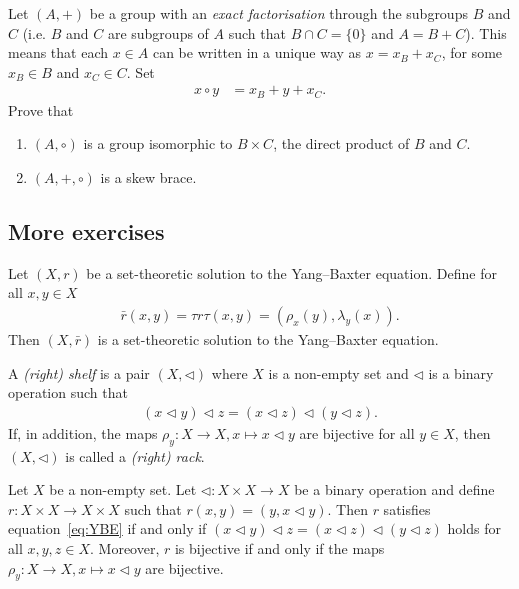 \documentclass[12pt]{amsproc}
\begin{document}
\begin{xca}\label{ex:ef}
        Let $(A,+)$ be a group with an \emph{exact factorisation} through the subgroups $B$ and $C$ (i.e. $B$ and $C$ are subgroups of $A$ such that $B\cap C=\{ 0\}$ and $A=B+C$). 
        This means that each $x\in A$ can be written in a unique way as $x=x_B+x_C$, for some $x_B\in B$ and $x_C\in C$.
        Set
        \begin{align*}
		    x\circ y&=x_B+y+x_C.
	    \end{align*}
        Prove that
        \begin{enumerate}
            \item $(A,\circ)$ is a group isomorphic to $B\times C$, the direct product of $B$ and $C$.
            \item $(A,+,\circ)$ is a  skew brace.
        \end{enumerate}
    \end{xca}

\subsection{More exercises}\mbox{}

\begin{xca}\label{ex:taurtau}
    Let $(X,r)$ be a set-theoretic solution to the Yang--Baxter equation. Define for all $x,y \in X$
    \begin{align*}
        \bar{r}(x,y) = \tau r \tau (x,y) = (\rho_x(y),\lambda_y(x)).
    \end{align*}
    Then $(X,\bar{r})$ is a set-theoretic solution to the Yang--Baxter equation.
\end{xca}

A \emph{(right) shelf} is a pair $(X,\triangleleft)$ where $X$ is a non-empty set and $\triangleleft$ is a binary operation such that 
    \begin{align*}
        (x\triangleleft y)\triangleleft z=(x\triangleleft z)\triangleleft(y\triangleleft z).
    \end{align*}
    If, in addition, the maps $\rho_y:X \to X, x \mapsto x\triangleleft y$ are bijective for all $y\in X$, then $(X,\triangleleft)$ is called a \emph{(right) rack}.
    
\begin{xca}\label{ex2}
     Let $X$ be a non-empty set.
     Let $\triangleleft: X\times X \to X$ be a binary operation and define $r: X\times X \to X\times X$ such that $r(x,y)= (y,x \triangleleft y)$. Then $r$ satisfies equation~\ref{eq:YBE} if and only if $(x\triangleleft y)\triangleleft z=(x\triangleleft z)\triangleleft(y\triangleleft z)$ holds for all $x,y,z \in X$. 
     Moreover, $r$ is bijective if and only if the maps $\rho_y:X\to X, x \mapsto x\triangleleft y$ are bijective.
\end{xca}
\end{document}
